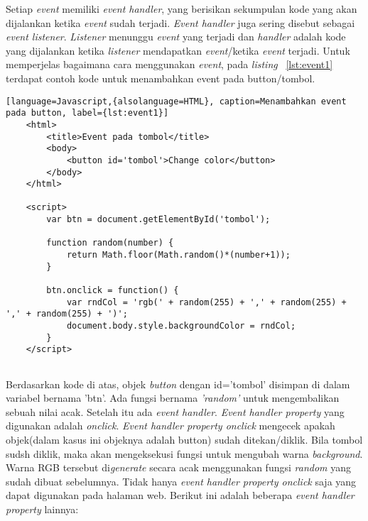 Setiap \textit{event} memiliki \textit{event handler}, yang berisikan sekumpulan kode yang akan dijalankan ketika \textit{event} sudah terjadi. \textit{Event handler} juga sering disebut sebagai \textit{event listener}. \textit{Listener} menunggu \textit{event} yang terjadi dan \textit{handler} adalah kode yang dijalankan ketika \textit{listener} mendapatkan \textit{event}/ketika \textit{event} terjadi. Untuk memperjelas bagaimana cara menggunakan \textit{event}, pada \textit{listing} ~\ref{lst:event1} terdapat contoh kode untuk menambahkan event pada button/tombol.

\begin{lstlisting}[language=Javascript,{alsolanguage=HTML}, caption=Menambahkan event pada button, label={lst:event1}]
	<html>
		<title>Event pada tombol</title>
		<body>
			<button id='tombol'>Change color</button>
		</body>
	</html>
	
	<script>
		var btn = document.getElementById('tombol');

		function random(number) {
  			return Math.floor(Math.random()*(number+1));
		}

		btn.onclick = function() {
  			var rndCol = 'rgb(' + random(255) + ',' + random(255) + ',' + random(255) + ')';
  			document.body.style.backgroundColor = rndCol;
		}
	</script>
	
\end{lstlisting}

Berdasarkan kode di atas, objek \textit{button} dengan id='tombol' disimpan di dalam variabel bernama 'btn'. Ada fungsi bernama \textit{'random'} untuk mengembalikan sebuah nilai acak. Setelah itu ada \textit{event handler}. \textit{Event handler property} yang digunakan adalah \textit{onclick}. \textit{Event handler property onclick} mengecek apakah objek(dalam kasus ini objeknya adalah button) sudah ditekan/diklik. Bila tombol sudsh diklik, maka akan mengeksekusi fungsi untuk mengubah warna \textit{background}. Warna RGB tersebut di\textit{generate} secara acak menggunakan fungsi \textit{random} yang sudah dibuat sebelumnya. Tidak hanya \textit{event handler property onclick} saja yang dapat digunakan pada halaman web. Berikut ini adalah beberapa \textit{event handler property} lainnya:


